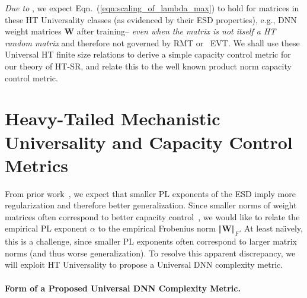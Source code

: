  \emph{Due to }, we expect Eqn.~(\ref{eqn:scaling_of_lambda_max}) to hold for matrices 
 in these HT Universality classes (as evidenced by their ESD properties), e.g., DNN weight matrices $\mathbf{W}$ after training--
  \emph{even when the matrix is not itself a HT random matrix} and therefore not governed by RMT or ~EVT.
We shall use these Universal HT finite size relations to derive a simple capacity control metric for our
 theory of HT-SR, and relate this to the well known product norm capacity control metric.


\section{Heavy-Tailed Mechanistic Universality and Capacity Control Metrics}
\label{sxn:theory-new}



%
From prior work~\cite{MM18_TR}, we expect that smaller PL exponents of the ESD imply more regularization and therefore better generalization. 
Since smaller norms of weight matrices often correspond to better capacity control~\cite{LMBx18_TR,SHNx17_TR,PLMx18_TR,BFT17_TR}, we would like to relate the empirical PL exponent $\alpha$ to the empirical Frobenius norm $\Vert\mathbf{W}\Vert_{F}$.
At least na\"{\i}vely, this is a challenge, since smaller PL exponents often correspond to larger matrix norms (and thus worse generalization\nred{!}).
To resolve this apparent discrepancy, we will exploit HT  Universality to propose a Universal DNN complexity metric.

\paragraph{Form of a Proposed Universal DNN Complexity Metric.} 

